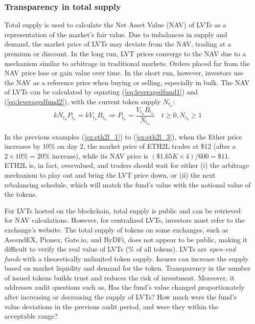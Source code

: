 \subsubsection{Transparency in total supply}
Total supply is used to calculate the Net Asset Value (NAV) of LVTs as a representation of the market's fair value. Due to imbalances in supply and demand, the market price of LVTs may deviate from the NAV, trading at a premium or discount. In the long run, LVT prices converge to the NAV due to a mechanism similar to arbitrage in traditional markets. Orders placed far from the NAV price lose or gain value over time. In the short run, however, investors use the NAV as a reference price when buying or selling, especially in bulk. The NAV of LVTs can be calculated by equating (\ref{eq:leveragedfund1}) and (\ref{eq:leveragedfund2}), with the current token supply $N_{t_{n}}$:
\begin{equation}\label{eq:nav}
	kN_{t_{n}}P_{t_{n}}=kV_{t_{n}}B_{t_{n}} \Rightarrow  P_{t_{n}}=\frac{V_{t_{n}}B_{t_{n}}}{N_{t_{n}}}\quad t \ge 0, N_{t_{0}} \ge 1
\end{equation}
\begin{example}
	In the previous examples (\ref{ex:eth2l_1}) to (\ref{ex:eth2l_3}), when the Ether price increases by 10\% on day 2, the market price of ETH2L trades at \$12 (after a $2\times{10\%}=20\%$ increase), while its NAV price is $(\$1.65K\times{4})/600=\$11$. ETH2L is, in fact, overvalued, and traders should wait for either (i) the arbitrage mechanism to play out and bring the LVT price down, or (ii) the next rebalancing schedule, which will match the fund's value with the notional value of the tokens.
\end{example}

For LVTs hosted on the blockchain, total supply is public and can be retrieved for NAV calculations. However, for centralized LVTs, investors must refer to the exchange's website. The total supply of tokens on some exchanges, such as AscendEX, Pionex, Gate.io, and ByDFi, does not appear to be public, making it difficult to verify the real value of LVTs (\% of all tokens). LVTs are \textsl{open-end funds} with a theoretically unlimited token supply. Issuers can increase the supply based on market liquidity and demand for the token. Transparency in the number of issued tokens builds trust and reduces the risk of investment. Moreover, it addresses audit questions such as, Has the fund's value changed proportionately after increasing or decreasing the supply of LVTs? How much were the fund's value deviations in the previous audit period, and were they within the acceptable range?

